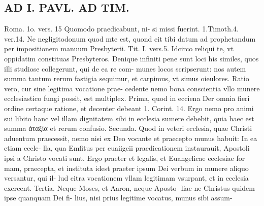 \documentclass{article}
\begin{document}
\begin{pages}
\section*{AD I. PAVL. AD TIM. }
\marginpar{[ p.42 ]}\pstart Roma. 1o. vers. 15 Quomodo praedicabunt, ni- si missi fuerint.  \pend\pstart 1.Timoth.4. ver.14. Ne negligitodonum quod mte est, quond eit tibi datum ad prophetandum per impositionem manuum Presbyterii.  \pend\pstart Tit. I. vers.5. Idcirco reliqui te, vt oppidatim constituas Presbyteros.  \pend\pstart Denique infiniti pene sunt loci his similes, quos illi studiose collegerunt, qui de ea re com- munes locos scripserunt: nos autem summa tantum rerum fastigia sequimur, et carpimus, vt simus oieulores.  \pend\pstart Ratio vero, cur sine legitima vocatione prae- cedente nemo bona conscientia vllo munere ecclesiastico fungi possit, est multiplex.  \pend\pstart Prima, quod in ecciena Der omnia fieri ordine certaque ratione, et decenter debeant 1. Corint. 14. Ergo nemo pro animi sui libito hanc vel illam dignitatem sibi in ecclesia sumere debebit, quia haec est summa ἀταξία et rerum confusio.  \pend\pstart Secunda. Quod in veteri ecclesia, quae Christi aduentum praecessit, nemo nisi ex Deo vocante et praecepto munus habuit: In ea etiam eccle- lla, qua Emfitus per euaiigeii praedicationem instaurauit, Apostoli ipsi a Christo vocati sunt. Ergo praeter et legalis, et Euangelicae eeclesiae for mam, praecepta, et instituta idest praeter ipsum Dei verbum in munere aliquo versantur, qui il- lud citra vocationem vllam legitimam vsurpant, et in ecclesia exercent.  \pend\pstart Tertia. Neque Moses, et Aaron, neque  Aposto- liac ne Christus quidem ipse quanquam Dei fi- lius, nisi prius legitime vocatus, munus sibi assum-  \pend

\end{pages}
\end{document}
